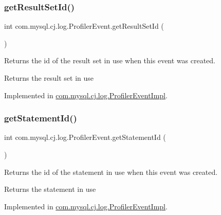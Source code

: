 \subsubsection{\texorpdfstring{get\+Result\+Set\+Id()}{getResultSetId()}}
{\footnotesize\ttfamily int com.\+mysql.\+cj.\+log.\+Profiler\+Event.\+get\+Result\+Set\+Id (\begin{DoxyParamCaption}{ }\end{DoxyParamCaption})}

Returns the id of the result set in use when this event was created.

\begin{DoxyReturn}{Returns}
the result set in use 
\end{DoxyReturn}


Implemented in \mbox{\hyperlink{classcom_1_1mysql_1_1cj_1_1log_1_1_profiler_event_impl_a2b432bffc0257f4825222bb9946a44ba}{com.\+mysql.\+cj.\+log.\+Profiler\+Event\+Impl}}.

\mbox{\label{interfacecom_1_1mysql_1_1cj_1_1log_1_1_profiler_event_abe6c8708b242e58efb697d63c0b78a6d}} 
\subsubsection{\texorpdfstring{get\+Statement\+Id()}{getStatementId()}}
{\footnotesize\ttfamily int com.\+mysql.\+cj.\+log.\+Profiler\+Event.\+get\+Statement\+Id (\begin{DoxyParamCaption}{ }\end{DoxyParamCaption})}

Returns the id of the statement in use when this event was created.

\begin{DoxyReturn}{Returns}
the statement in use 
\end{DoxyReturn}


Implemented in \mbox{\hyperlink{classcom_1_1mysql_1_1cj_1_1log_1_1_profiler_event_impl_a3a30e724b4b86369376e1a7402f16d66}{com.\+mysql.\+cj.\+log.\+Profiler\+Event\+Impl}}.

\mbox{\label{interfacecom_1_1mysql_1_1cj_1_1log_1_1_profiler_event_ad360df515f55034065a78397e2db5269}} 
